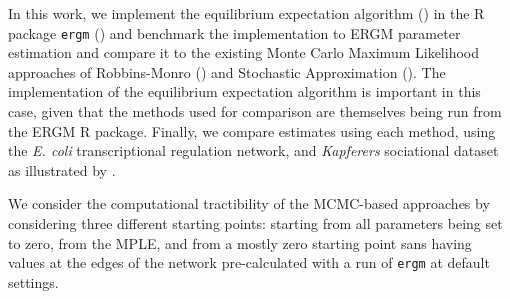 In this work, we implement the equilibrium expectation algorithm (\cite{eqexpectation}) in the R package \texttt{ergm} (\cite{ergm}) and benchmark the implementation to ERGM parameter estimation and compare it to the existing Monte Carlo Maximum Likelihood approaches of Robbins-Monro (\cite{robbinsmonro1951}) and Stochastic Approximation (\cite{snijders2002}). The implementation of the equilibrium expectation algorithm is important in this case, given that the methods used for comparison are themselves being run from the ERGM R package. Finally, we compare estimates using each method, using the \textit{E. coli} transcriptional regulation network, and \textit{Kapferers} sociational dataset as illustrated by \cite{hummels2012}.

We consider the computational tractibility of the MCMC-based approaches by considering three different starting points: starting from all parameters being set to zero, from the MPLE, and from a mostly zero starting point sans having values at the edges of the network pre-calculated with a run of \texttt{ergm} at default settings. 